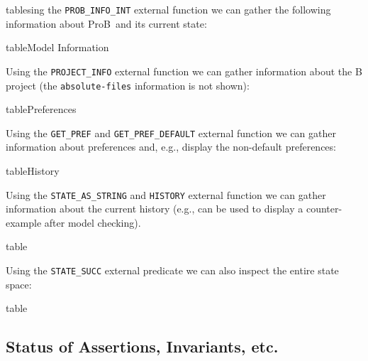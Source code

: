 \documentclass[final]{llncs}
\newcommand{\prob}{{\sc ProB}}
\newcommand{\probtable}[3][no]{table} %
\begin{document}
\probtable{{Flag,StringValue|StringValue=PROB_INFO_STR(Flag) & Flag /= "prolog-version"}}

Using the {\tt PROB\_INFO\_INT} external function we can gather the following information about \prob\ and its
 current state:

\probtable{{Flag,IntValue|IntValue=PROB_INFO_INT(Flag)}}

\subsection{Model Information}

Using the {\tt PROJECT\_INFO} external function we can gather information about the B project (the {\tt absolute-files}
 information is not shown):

\probtable{{Flag,Value|Value=PROJECT_INFO(Flag) & Flag /= "absolute-files"}}

\subsection{Preferences}

Using the {\tt GET\_PREF} and {\tt GET\_PREF\_DEFAULT} external function we can gather information about preferences and, e.g., display the non-default preferences:

\probtable{{Preference,Value|Value=GET_PREF(Preference) & Value /= GET_PREF_DEFAULT(Preference)}}



\subsection{History}

Using the {\tt STATE\_AS\_STRING} and {\tt HISTORY} external function we can gather information about
 the current history (e.g., can be used to display a counter-example after model checking).

\probtable{{Step,ID,State|(Step,ID):HISTORY & State=STATE_AS_STRING(ID)}}{no-row-numbers}

Using the {\tt STATE\_SUCC} external predicate we can also inspect the entire state space:

\probtable{{ID,SuccID| STATE_SUCC(ID,SuccID)}}{no-row-numbers}


\subsection{Status of Assertions, Invariants, etc.}
\end{document}
